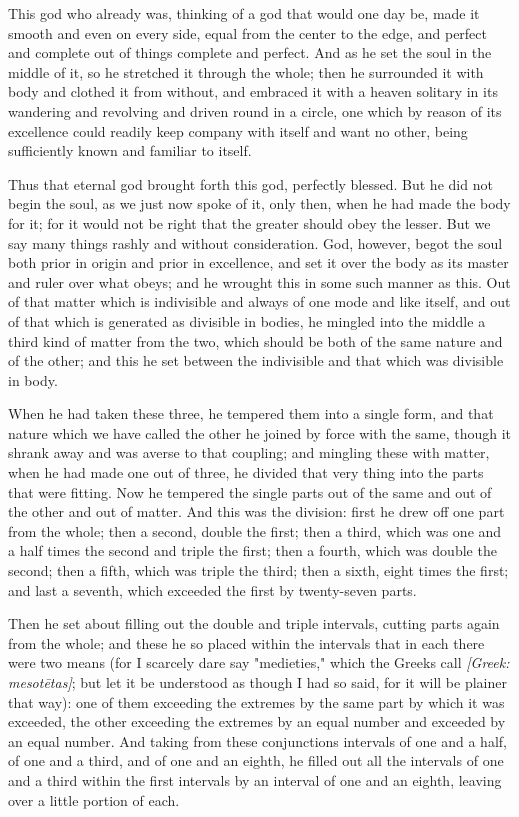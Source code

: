  This god who already was, thinking of a god that would one day be, made it smooth and even on every side, equal from the center to the edge, and perfect and complete out of things complete and perfect. And as he set the soul in the middle of it, so he stretched it through the whole; then he surrounded it with body and clothed it from without, and embraced it with a heaven solitary in its wandering and revolving and driven round in a circle, one which by reason of its excellence could readily keep company with itself and want no other, being sufficiently known and familiar to itself.

 Thus that eternal god brought forth this god, perfectly blessed. But he did not begin the soul, as we just now spoke of it, only then, when he had made the body for it; for it would not be right that the greater should obey the lesser. But we say many things rashly and without consideration. God, however, begot the soul both prior in origin and prior in excellence, and set it over the body as its master and ruler over what obeys; and he wrought this in some such manner as this. Out of that matter which is indivisible and always of one mode and like itself, and out of that which is generated as divisible in bodies, he mingled into the middle a third kind of matter from the two, which should be both of the same nature and of the other; and this he set between the indivisible and that which was divisible in body.

 When he had taken these three, he tempered them into a single form, and that nature which we have called the other he joined by force with the same, though it shrank away and was averse to that coupling; and mingling these with matter, when he had made one out of three, he divided that very thing into the parts that were fitting. Now he tempered the single parts out of the same and out of the other and out of matter. And this was the division: first he drew off one part from the whole; then a second, double the first; then a third, which was one and a half times the second and triple the first; then a fourth, which was double the second; then a fifth, which was triple the third; then a sixth, eight times the first; and last a seventh, which exceeded the first by twenty-seven parts.

 Then he set about filling out the double and triple intervals, cutting parts again from the whole; and these he so placed within the intervals that in each there were two means (for I scarcely dare say "medieties," which the Greeks call \textit{[Greek: mesotētas]}; but let it be understood as though I had so said, for it will be plainer that way): one of them exceeding the extremes by the same part by which it was exceeded, the other exceeding the extremes by an equal number and exceeded by an equal number. And taking from these conjunctions intervals of one and a half, of one and a third, and of one and an eighth, he filled out all the intervals of one and a third within the first intervals by an interval of one and an eighth, leaving over a little portion of each.

